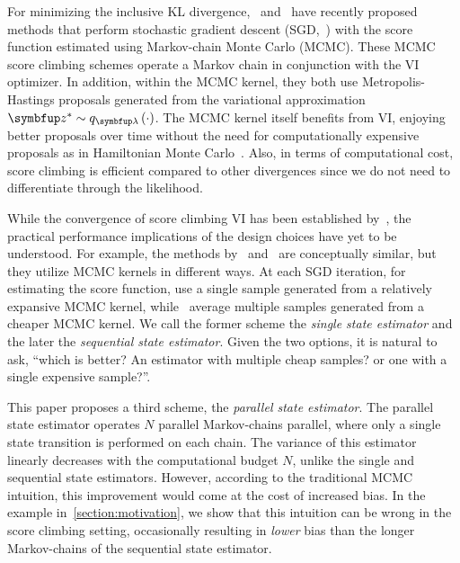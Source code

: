 For minimizing the inclusive KL divergence,~\citet{NEURIPS2020_b2070693} and~\citet{pmlr-v124-ou20a} have recently proposed  methods that perform stochastic gradient descent (SGD,~\citealt{robbins_stochastic_1951}) with the score function estimated using Markov-chain Monte Carlo (MCMC).
These MCMC score climbing schemes operate a Markov chain in conjunction with the VI optimizer.
In addition, within the MCMC kernel, they both use Metropolis-Hastings proposals generated from the variational approximation \(\vz^* \sim q_{\vlambda}\left(\cdot\right)\).
The MCMC kernel itself benefits from VI, enjoying better proposals over time without the need for computationally expensive proposals as in Hamiltonian Monte Carlo~\citep{duane_hybrid_1987, neal_mcmc_2011, betancourt_conceptual_2017}.
Also, in terms of computational cost, score climbing is efficient compared to other divergences since we do not need to differentiate through the likelihood.

While the convergence of score climbing VI has been established by~\citet{NEURIPS2020_b2070693, gu_stochastic_1998}, the practical performance implications of the design choices have yet to be understood.
For example, the methods by~\citeauthor{NEURIPS2020_b2070693} and~\citet{pmlr-v124-ou20a} are conceptually similar, but they utilize MCMC kernels in different ways.
At each SGD iteration, for estimating the score function, \citeauthor{NEURIPS2020_b2070693} use a single sample generated from a relatively expansive MCMC kernel, while~\citeauthor{pmlr-v124-ou20a} average multiple samples generated from a cheaper MCMC kernel.
We call the former scheme the \textit{single state estimator} and the later the \textit{sequential state estimator}.
Given the two options, it is natural to ask, ``which is better? An estimator with multiple cheap samples? or one with a single expensive sample?''.

This paper proposes a third scheme, the \textit{parallel state estimator}.
The parallel state estimator operates \(N\) parallel Markov-chains parallel, where only a single state transition is performed on each chain.
The variance of this estimator linearly decreases with the computational budget \(N\), unlike the single and sequential state estimators.
However, according to the traditional MCMC intuition, this improvement would come at the cost of increased bias.
In the example in~\cref{section:motivation}, we show that this intuition can be wrong in the score climbing setting, occasionally resulting in \textit{lower} bias than the longer Markov-chains of the sequential state estimator.


